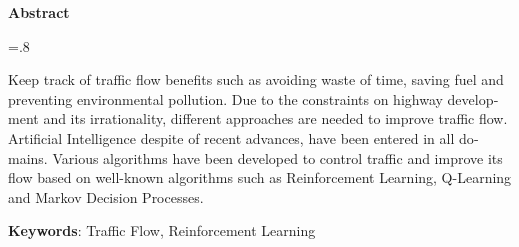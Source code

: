 


\pagestyle{empty}

\begin{latin}

\begin{center}
\textbf{Abstract}
\end{center}
\baselineskip=.8\baselineskip

Keep track of traffic flow benefits such as avoiding waste of time, saving fuel and preventing environmental pollution. Due to the constraints on highway development and its irrationality, different approaches are needed to improve traffic flow. Artificial Intelligence despite of recent advances, have been entered in all domains. Various algorithms have been developed to control traffic and improve its flow based on well-known algorithms such as Reinforcement Learning, Q-Learning and Markov Decision Processes. 

\bigskip\noindent\textbf{Keywords}:
Traffic Flow, Reinforcement Learning

\end{latin}

\newpage
